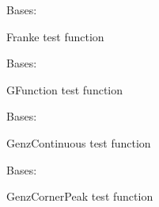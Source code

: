\documentclass[letterpaper,10pt,english,openany,oneside]{sphinxmanual}
\begin{document}
\begin{fulllineitems}
\label{\detokenize{pygpc:pygpc.Test.Franke}}
Bases: {\hyperref[\detokenize{pygpc:pygpc.Test.Test}]{}}

Franke test function

\end{fulllineitems}


\begin{fulllineitems}
\label{\detokenize{pygpc:pygpc.Test.GFunction}}
Bases: {\hyperref[\detokenize{pygpc:pygpc.Test.Test}]{}}

GFunction test function

\end{fulllineitems}


\begin{fulllineitems}
\label{\detokenize{pygpc:pygpc.Test.GenzContinuous}}
Bases: {\hyperref[\detokenize{pygpc:pygpc.Test.Test}]{}}

GenzContinuous test function

\end{fulllineitems}


\begin{fulllineitems}
\label{\detokenize{pygpc:pygpc.Test.GenzCornerPeak}}
Bases: {\hyperref[\detokenize{pygpc:pygpc.Test.Test}]{}}

GenzCornerPeak test function

\end{fulllineitems}
\end{document}
